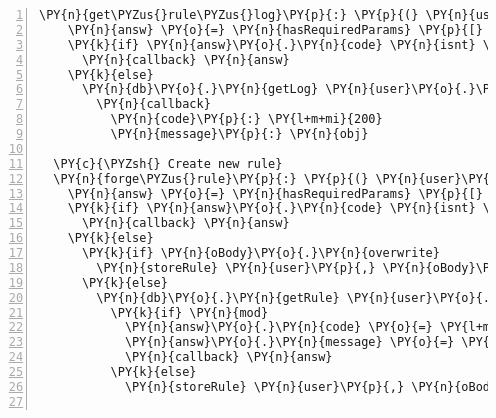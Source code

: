 \begin{Verbatim}[fontsize=\scriptsize,commandchars=\\\{\},numbers=left,firstnumber=1,stepnumber=1]
  \PY{n}{get\PYZus{}rule\PYZus{}log}\PY{p}{:} \PY{p}{(} \PY{n}{user}\PY{p}{,} \PY{n}{oBody}\PY{p}{,} \PY{n}{callback} \PY{p}{)} \PY{o}{\PYZhy{}}\PY{o}{\PYZgt{}}
    \PY{n}{answ} \PY{o}{=} \PY{n}{hasRequiredParams} \PY{p}{[} \PY{l+s}{\PYZsq{}}\PY{l+s}{id}\PY{l+s}{\PYZsq{}} \PY{p}{]}\PY{p}{,} \PY{n}{oBody}
    \PY{k}{if} \PY{n}{answ}\PY{o}{.}\PY{n}{code} \PY{n}{isnt} \PY{l+m+mi}{200}
      \PY{n}{callback} \PY{n}{answ}
    \PY{k}{else}
      \PY{n}{db}\PY{o}{.}\PY{n}{getLog} \PY{n}{user}\PY{o}{.}\PY{n}{username}\PY{p}{,} \PY{n}{oBody}\PY{o}{.}\PY{n}{id}\PY{p}{,} \PY{p}{(} \PY{n}{err}\PY{p}{,} \PY{n}{obj} \PY{p}{)} \PY{o}{\PYZhy{}}\PY{o}{\PYZgt{}}
        \PY{n}{callback}
          \PY{n}{code}\PY{p}{:} \PY{l+m+mi}{200}
          \PY{n}{message}\PY{p}{:} \PY{n}{obj}

  \PY{c}{\PYZsh{} Create new rule}
  \PY{n}{forge\PYZus{}rule}\PY{p}{:} \PY{p}{(} \PY{n}{user}\PY{p}{,} \PY{n}{oBody}\PY{p}{,} \PY{n}{callback} \PY{p}{)} \PY{o}{\PYZhy{}}\PY{o}{\PYZgt{}}
    \PY{n}{answ} \PY{o}{=} \PY{n}{hasRequiredParams} \PY{p}{[} \PY{l+s}{\PYZsq{}}\PY{l+s}{id}\PY{l+s}{\PYZsq{}}\PY{p}{,} \PY{l+s}{\PYZsq{}}\PY{l+s}{eventname}\PY{l+s}{\PYZsq{}}\PY{p}{,} \PY{l+s}{\PYZsq{}}\PY{l+s}{conditions}\PY{l+s}{\PYZsq{}}\PY{p}{,} \PY{l+s}{\PYZsq{}}\PY{l+s}{actions}\PY{l+s}{\PYZsq{}} \PY{p}{]}\PY{p}{,} \PY{n}{oBody}
    \PY{k}{if} \PY{n}{answ}\PY{o}{.}\PY{n}{code} \PY{n}{isnt} \PY{l+m+mi}{200}
      \PY{n}{callback} \PY{n}{answ}
    \PY{k}{else}
      \PY{k}{if} \PY{n}{oBody}\PY{o}{.}\PY{n}{overwrite}
        \PY{n}{storeRule} \PY{n}{user}\PY{p}{,} \PY{n}{oBody}\PY{p}{,} \PY{n}{callback}
      \PY{k}{else}
        \PY{n}{db}\PY{o}{.}\PY{n}{getRule} \PY{n}{user}\PY{o}{.}\PY{n}{username}\PY{p}{,} \PY{n}{oBody}\PY{o}{.}\PY{n}{id}\PY{p}{,} \PY{p}{(} \PY{n}{err}\PY{p}{,} \PY{n}{mod} \PY{p}{)} \PY{o}{=}\PY{o}{\PYZgt{}}
          \PY{k}{if} \PY{n}{mod}
            \PY{n}{answ}\PY{o}{.}\PY{n}{code} \PY{o}{=} \PY{l+m+mi}{409}
            \PY{n}{answ}\PY{o}{.}\PY{n}{message} \PY{o}{=} \PY{l+s}{\PYZsq{}}\PY{l+s}{Rule name already existing: }\PY{l+s}{\PYZsq{}} \PY{o}{+} \PY{n}{oBody}\PY{o}{.}\PY{n}{id}
            \PY{n}{callback} \PY{n}{answ}
          \PY{k}{else}
            \PY{n}{storeRule} \PY{n}{user}\PY{p}{,} \PY{n}{oBody}\PY{p}{,} \PY{n}{callback}


\end{Verbatim}
